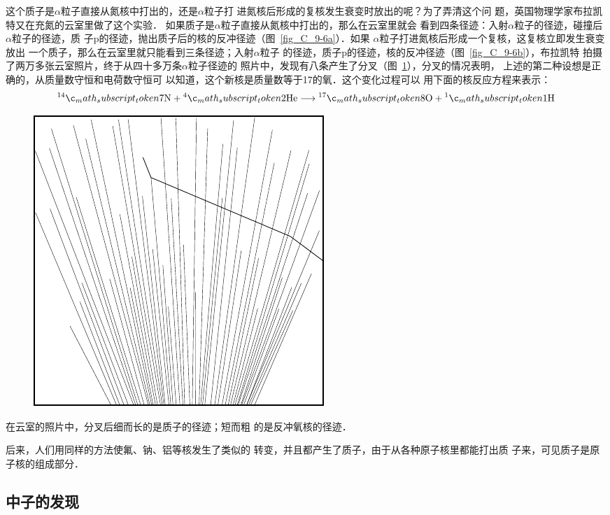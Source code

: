 这个质子是$\alpha$粒子直接从氮核中打出的，还是$\alpha$粒子打
进氮核后形成的复核发生衰变时放出的呢？为了弄清这个问
题，英国物理学家布拉凯特又在充氮的云室里做了这个实验．
如果质子是$\alpha$粒子直接从氮核中打出的，那么在云室里就会
看到四条径迹：入射$\alpha$粒子的径迹，碰撞后$\alpha$粒子的径迹，质
子p的径迹，抛出质子后的核的反冲径迹（图~\ref{fig_C_9-6a}）．如果
$\alpha$粒子打进氮核后形成一个复核，这复核立即发生衰变放出
一个质子，那么在云室里就只能看到三条径迹；入射$\alpha$粒子
的径迹，质子p的径迹，核的反冲径迹（图~\ref{fig_C_9-6b}），布拉凯特
拍摄了两万多张云室照片，终于从四十多万条$\alpha$粒子径迹的
照片中，发现有八条产生了分叉（图~\ref{fig_C_9-7}），分叉的情况表明，
上述的第二种设想是正确的，从质量数守恒和电荷数守恒可
以知道，这个新核是质量数等于17的氧．这个变化过程可以
用下面的核反应方程来表示：
\[\atom{N}{14}{7}+\atom{He}{4}{2}\longrightarrow \atom{O}{17}{8}+\atom{H}{1}{1} \]
\begin{figure}[htbp]
    \centering
    \includegraphics{fig/C/9-7.pdf}
    \caption{}\label{fig_C_9-7}
\end{figure}

在云室的照片中，分叉后细而长的是质子的径迹；短而粗
的是反冲氧核的径迹．

后来，人们用同样的方法使氟、钠、铝等核发生了类似的
转变，并且都产生了质子，由于从各种原子核里都能打出质
子来，可见质子是原子核的组成部分．

\subsection{中子的发现}


